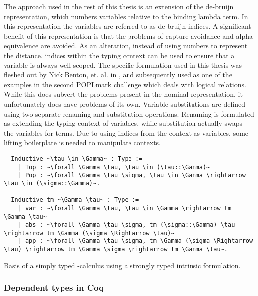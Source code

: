 \documentclass[12pt, final]{article}
\begin{document}
The approach used in the rest of this thesis is an extension of the de-bruijn representation, which numbers variables relative to the binding lambda term.
In this representation the variables are referred to as de-bruijn indices.
A significant benefit of this representation is that the problems of capture avoidance and alpha equivalence are avoided.
As an alteration, instead of using numbers to represent the distance, indices within the typing context can be used to ensure that a variable is always well-scoped.
The specific formulation used in this thesis was fleshed out by Nick Benton, et. al. in \cite{Benton2011}, and subsequently used as one of the examples in the second POPLmark challenge which deals with logical relations\cite{poplmark_reloaded}.
While this does subvert the problems present in the nominal representation, it unfortunately does have problems of its own.
Variable substitutions are defined using two separate renaming and substitution operations.
Renaming is formulated as extending the typing context of variables, while substitution actually swaps the variables for terms.
Due to using indices from the context as variables, some lifting boilerplate is needed to manipulate contexts.

\begin{listing}
  \begin{verbatim}
  Inductive ~\tau \in \Gamma~ : Type :=
    | Top : ~\forall \Gamma \tau, \tau \in (\tau::\Gamma)~
    | Pop : ~\forall \Gamma \tau \sigma, \tau \in \Gamma \rightarrow \tau \in (\sigma::\Gamma)~.

  Inductive tm ~\Gamma \tau~ : Type :=
    | var : ~\forall \Gamma \tau, \tau \in \Gamma \rightarrow tm \Gamma \tau~
    | abs : ~\forall \Gamma \tau \sigma, tm (\sigma::\Gamma) \tau \rightarrow tm \Gamma (\sigma \Rightarrow \tau)~
    | app : ~\forall \Gamma \tau \sigma, tm \Gamma (\sigma \Rightarrow \tau) \rightarrow tm \Gamma \sigma \rightarrow tm \Gamma \tau~.
  \end{verbatim}
  \caption{Basis of a simply typed \lambda-calculus using a strongly typed intrinsic formulation.}
  \label{lst:strong_stlc}
\end{listing}

\subsubsection{Dependent types in Coq}
\end{document}

